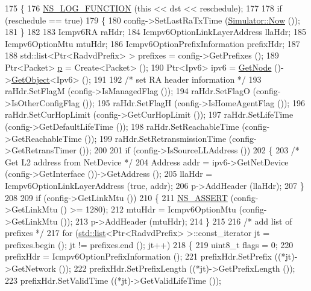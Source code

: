 \begin{DoxyCode}
175 \{
176   \hyperlink{log-macros-disabled_8h_a90b90d5bad1f39cb1b64923ea94c0761}{NS\_LOG\_FUNCTION} (\textcolor{keyword}{this} << dst << reschedule);
177 
178   \textcolor{keywordflow}{if} (reschedule == \textcolor{keyword}{true})
179     \{
180       config->SetLastRaTxTime (\hyperlink{classns3_1_1Simulator_ac3178fa975b419f7875e7105be122800}{Simulator::Now} ());
181     \}
182 
183   Icmpv6RA raHdr;
184   Icmpv6OptionLinkLayerAddress llaHdr;
185   Icmpv6OptionMtu mtuHdr;
186   Icmpv6OptionPrefixInformation prefixHdr;
187 
188   std::list<Ptr<RadvdPrefix> > prefixes = config->GetPrefixes ();
189   Ptr<Packet> \hyperlink{lte__link__budget_8m_ac9de518908a968428863f829398a4e62}{p} = Create<Packet> ();
190   Ptr<Ipv6> ipv6 = \hyperlink{classns3_1_1Application_a664b15088389bec8e35b35742138f097}{GetNode} ()->\hyperlink{classns3_1_1Object_a13e18c00017096c8381eb651d5bd0783}{GetObject}<Ipv6> ();
191 
192   \textcolor{comment}{/* set RA header information */}
193   raHdr.SetFlagM (config->IsManagedFlag ());
194   raHdr.SetFlagO (config->IsOtherConfigFlag ());
195   raHdr.SetFlagH (config->IsHomeAgentFlag ());
196   raHdr.SetCurHopLimit (config->GetCurHopLimit ());
197   raHdr.SetLifeTime (config->GetDefaultLifeTime ());
198   raHdr.SetReachableTime (config->GetReachableTime ());
199   raHdr.SetRetransmissionTime (config->GetRetransTimer ());
200 
201   \textcolor{keywordflow}{if} (config->IsSourceLLAddress ())
202     \{
203       \textcolor{comment}{/* Get L2 address from NetDevice */}
204       Address addr = ipv6->GetNetDevice (config->GetInterface ())->GetAddress ();
205       llaHdr = Icmpv6OptionLinkLayerAddress (\textcolor{keyword}{true}, addr);
206       p->AddHeader (llaHdr);
207     \}
208 
209   \textcolor{keywordflow}{if} (config->GetLinkMtu ())
210     \{
211       \hyperlink{assert_8h_a6dccdb0de9b252f60088ce281c49d052}{NS\_ASSERT} (config->GetLinkMtu () >= 1280);
212       mtuHdr = Icmpv6OptionMtu (config->GetLinkMtu ());
213       p->AddHeader (mtuHdr);
214     \}
215 
216   \textcolor{comment}{/* add list of prefixes */}
217   \textcolor{keywordflow}{for} (\hyperlink{openflow-interface_8h_afd9bcfa176617760671b67580f536fa7}{std::list}<Ptr<RadvdPrefix> >::const\_iterator jt = prefixes.begin (); jt != prefixes.end ();
       jt++)
218     \{
219       uint8\_t flags = 0;
220       prefixHdr = Icmpv6OptionPrefixInformation ();
221       prefixHdr.SetPrefix ((*jt)->GetNetwork ());
222       prefixHdr.SetPrefixLength ((*jt)->GetPrefixLength ());
223       prefixHdr.SetValidTime ((*jt)->GetValidLifeTime ());

\end{DoxyCode}
